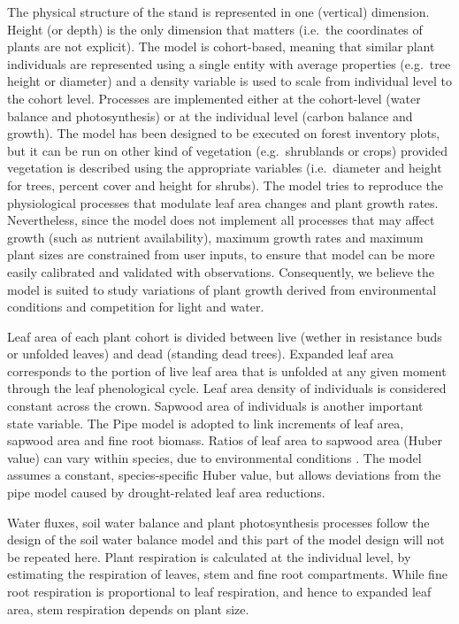 \documentclass[]{book}
\begin{document}
The physical structure of the stand is represented in one (vertical) dimension. Height (or depth) is the only dimension that matters (i.e.~the coordinates of plants are not explicit). The model is cohort-based, meaning that similar plant individuals are represented using a single entity with average properties (e.g.~tree height or diameter) and a density variable is used to scale from individual level to the cohort level. Processes are implemented either at the cohort-level (water balance and photosynthesis) or at the individual level (carbon balance and growth). The model has been designed to be executed on forest inventory plots, but it can be run on other kind of vegetation (e.g.~shrublands or crops) provided vegetation is described using the appropriate variables (i.e.~diameter and height for trees, percent cover and height for shrubs). The model tries to reproduce the physiological processes that modulate leaf area changes and plant growth rates. Nevertheless, since the model does not implement all processes that may affect growth (such as nutrient availability), maximum growth rates and maximum plant sizes are constrained from user inputs, to ensure that model can be more easily calibrated and validated with observations. Consequently, we believe the model is suited to study variations of plant growth derived from environmental conditions and competition for light and water.

Leaf area of each plant cohort is divided between live (wether in resistance buds or unfolded leaves) and dead (standing dead trees). Expanded leaf area corresponds to the portion of live leaf area that is unfolded at any given moment through the leaf phenological cycle. Leaf area density of individuals is considered constant across the crown. Sapwood area of individuals is another important state variable. The Pipe model \citep{Shinozaki1964} is adopted to link increments of leaf area, sapwood area and fine root biomass. Ratios of leaf area to sapwood area (Huber value) can vary within species, due to environmental conditions \citep{Mencuccini1995}. The model assumes a constant, species-specific Huber value, but allows deviations from the pipe model caused by drought-related leaf area reductions.

Water fluxes, soil water balance and plant photosynthesis processes follow the design of the soil water balance model and this part of the model design will not be repeated here. Plant respiration is calculated at the individual level, by estimating the respiration of leaves, stem and fine root compartments. While fine root respiration is proportional to leaf respiration, and hence to expanded leaf area, stem respiration depends on plant size.
\end{document}
